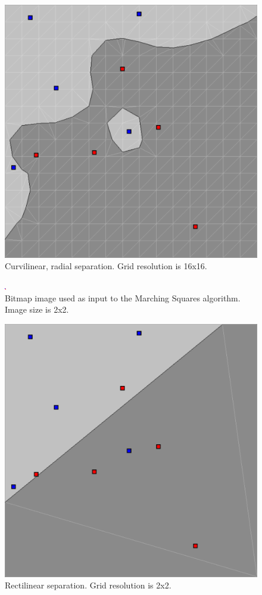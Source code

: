 \documentclass[12pt]{article}
\begin{document}
\begin{figure} 
\centering
  \includegraphics[width = 3 in]{16_res.png}
  \caption{Curvilinear, radial separation. Grid resolution is 16x16.
}
\end{figure}

\begin{figure} 
\centering
  \includegraphics[width = 3 in]{2_res_image.png}
  \caption{Bitmap image used as input to the Marching Squares algorithm.
Image size is 2x2.
}
\end{figure}


\begin{figure} 
\centering
  \includegraphics[width = 3 in]{2_res.png}
  \caption{Rectilinear separation. Grid resolution is 2x2.
}
\end{figure}
\end{document}
